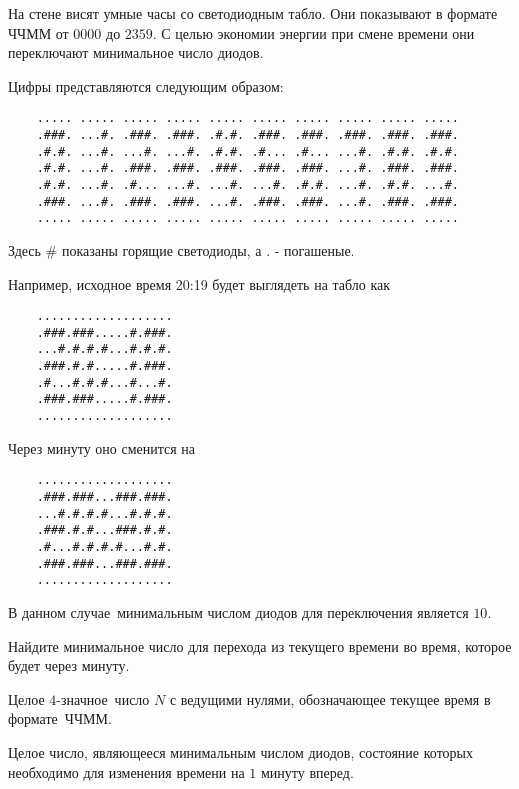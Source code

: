 
На стене висят умные часы со светодиодным табло. Они показывают в формате ЧЧММ от $0000$ до $2359$. С целью экономии энергии при смене времени они переключают минимальное число диодов.

Цифры представляются следующим образом:

\begin{verbatim}
    ..... ..... ..... ..... ..... ..... ..... ..... ..... .....
    .###. ...#. .###. .###. .#.#. .###. .###. .###. .###. .###.
    .#.#. ...#. ...#. ...#. .#.#. .#... .#... ...#. .#.#. .#.#.
    .#.#. ...#. .###. .###. .###. .###. .###. ...#. .###. .###.
    .#.#. ...#. .#... ...#. ...#. ...#. .#.#. ...#. .#.#. ...#.
    .###. ...#. .###. .###. ...#. .###. .###. ...#. .###. .###.
    ..... ..... ..... ..... ..... ..... ..... ..... ..... .....
\end{verbatim}

Здесь \# показаны горящие светодиоды, а . - погашеные.

Например, исходное время 20:19 будет выглядеть на табло как

\begin{verbatim}
    ...................
    .###.###.....#.###.
    ...#.#.#.#...#.#.#.
    .###.#.#.....#.###.
    .#...#.#.#...#...#.
    .###.###.....#.###.
    ...................
\end{verbatim}

Через минуту оно сменится на  

\begin{verbatim}
    ...................
    .###.###...###.###.
    ...#.#.#.#...#.#.#.
    .###.#.#...###.#.#.
    .#...#.#.#.#...#.#.
    .###.###...###.###.
    ...................
\end{verbatim}

В данном случае минимальным числом диодов для переключения является $10$.

Найдите минимальное число для перехода из текущего времени во время, которое будет через минуту.


Целое $4$-значное число $N$ с ведущими нулями, обозначающее текущее время в формате ЧЧММ.

\outputfmtSection

Целое число, являющееся минимальным числом диодов, состояние которых необходимо для изменения времени на $1$ минуту вперед.


